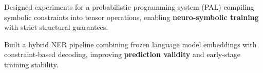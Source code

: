     \vspace{0.10 cm}
    \begin{onecolentry}
        \begin{highlights}
    
    \item Designed experiments for a probabilistic programming system (PAL) compiling symbolic constraints into tensor operations, enabling \textbf{neuro-symbolic training} with strict structural guarantees.

    \item Built a hybrid NER pipeline combining frozen language model embeddings with constraint-based decoding, improving \textbf{prediction validity} and early-stage training stability.

        
        \end{highlights}
    \end{onecolentry}
